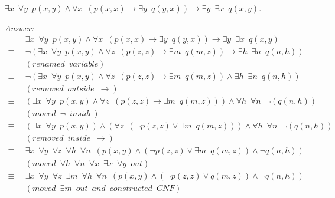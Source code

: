 \documentclass[12pt]{article}
\begin{document}
$\exists x \enspace \forall y \enspace p(x, y) \land \forall x \enspace (p(x, x) \rightarrow \exists y 
\enspace q(y, x)) \rightarrow \exists y \enspace \exists x \enspace q(x, y)$.

\emph{Answer:} 
\begin{align*}
& \exists x \enspace \forall y \enspace p(x, y) \land \forall x \enspace (p(x, x) \rightarrow \exists y 
  \enspace q(y, x)) \rightarrow \exists y \enspace \exists x \enspace q(x, y)   & && \\
        \equiv \enspace & \neg (\exists x \enspace \forall y \enspace p(x, y) \land \forall z \enspace (p(z, z) 
                          \rightarrow \exists m \enspace q(m, z)) \rightarrow \exists h \enspace \exists n 
                          \enspace q(n, h)) \\
                        & (renamed \enspace variable) \\
        \equiv \enspace & \neg (\exists x \enspace \forall y \enspace p(x, y) \land \forall z \enspace (p(z, z) 
                          \rightarrow \exists m \enspace q(m, z)) \land \exists h \enspace \exists n 
                          \enspace q(n, h)) \\
                        & (removed \enspace outside \enspace \rightarrow) \\
        \equiv \enspace & (\exists x \enspace \forall y \enspace p(x, y) \land \forall z \enspace (p(z, z) 
                          \rightarrow \exists m \enspace q(m, z))) \land \forall h \enspace \forall n 
                          \enspace \neg (q(n, h)) \\
                        & (moved \enspace \neg \enspace inside) \\
        \equiv \enspace & (\exists x \enspace \forall y \enspace p(x, y)) \land (\forall z \enspace 
                          (\neg p(z, z) \lor \exists m \enspace q(m, z))) \land \forall h \enspace \forall n 
                          \enspace \neg (q(n, h)) \\
                        & (removed \enspace inside \enspace \rightarrow) \\
        \equiv \enspace & \exists x \enspace \forall y \enspace \forall z \enspace \forall h \enspace \forall n   
                          \enspace (p(x, y) \land (\neg p(z, z) \lor \exists m \enspace q(m, z)) 
                          \land \neg q(n, h)) \\
                        & (moved\enspace \forall h \enspace \forall n \enspace\forall x \enspace \exists x 
                          \enspace \forall y \enspace out )\\
        \equiv \enspace & \exists x \enspace \forall y \enspace \forall z \enspace \exists m \enspace \forall h 
                           \enspace \forall n \enspace (p(x, y) \land (\neg p(z, z) 
                           \lor q(m, z)) \land \neg q(n, h)) \\
                        & (moved\enspace  \exists m \enspace out \enspace and \enspace constructed \enspace CNF) \\
\end{align*}
\end{document}

